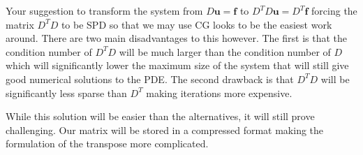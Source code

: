 \documentclass[12pt]{article}
\let\vec\mathbf
\begin{document}
	Your suggestion to transform the system from $D\vec{u} = \vec{f}$ to $D^TD\vec{u} = D^T\vec{f}$ forcing the matrix $D^TD$ to be SPD so that we may use CG looks to be the easiest work around. There are two main disadvantages to this however. The first is that the condition number of $D^TD$ will be much larger than the condition number of $D$ which will significantly lower the maximum size of the system that will still give good numerical solutions to the PDE. The second drawback is that $D^TD$ will be significantly less sparse than $D^T$ making iterations more expensive.
	
	While this solution will be easier than the alternatives, it will still prove challenging. Our matrix will be stored in a compressed format making the formulation of the transpose more complicated.
	  
 
\pagebreak
 
\printbibliography
\end{document}
